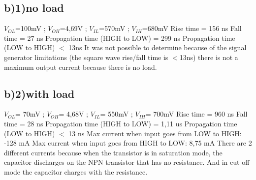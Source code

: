 \documentclass[a4paper,12pt]{article}
\begin{document}
\subsection*{b)1)no load}
$V_{OL}$=100mV ; 
$V_{OH}$=4,69V ; 
$V_{IL}$=570mV ; 
$V_{IH}$=680mV 
\newline
Rise time = 156 ns
\newline
Fall time = 27 ns
\newline
Propagation time (HIGH to LOW) = 299 ns
\newline
Propagation time (LOW to HIGH) $<$ 13ns
\newline
It was not possible to determine because of the signal generator limitations
(the square wave rise/fall time is $<$13ns)
there is not a maximum output current because there is no load. 

\subsection*{b)2)with load} 

$V_{OL}$= 70mV ; 
$V_{OH}$= 4,68V ; 
$V_{IL}$= 550mV ;
$V_{IH}$= 700mV
\newline
Rise time = 960 ns
\newline
Fall time = 28 ns
\newline
Propagation time (HIGH to LOW) = 1,11 us
\newline
Propagation time (LOW to HIGH) $<$ 13 ns
\newline
Max current when input goes from LOW to HIGH: -128 mA
\newline
Max current when input goes from HIGH to LOW: 8,75 mA
\newline
There are 2 different currents because when the transistor
 is in saturation mode, the capacitor discharges on the 
 NPN transistor that has no resistance. And in cut off
  mode the capacitor charges with the resistance.
\end{document}
